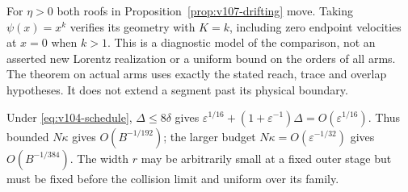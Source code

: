 \begin{remark}\label{rem:v107-scope}
For $\eta>0$ both roofs in Proposition~\ref{prop:v107-drifting}
move. Taking $\psi(x)=x^k$ verifies its geometry with $K=k$,
including zero endpoint velocities at $x=0$ when $k>1$.
This is a diagnostic model of the comparison, not an asserted new
Lorentz realization or a uniform bound on the orders of all arms.
The theorem on actual arms uses exactly the stated reach, trace and
overlap hypotheses. It does not extend a segment past its physical
boundary.

Under \eqref{eq:v104-schedule}, $\Delta\le8\delta$ gives
$\varepsilon^{1/16}+(1+\varepsilon^{-1})\Delta=O(\varepsilon^{1/16})$.
Thus bounded $N\kappa$ gives $O(B^{-1/192})$; the larger budget
$N\kappa=O(\varepsilon^{-1/32})$ gives $O(B^{-1/384})$.
The width $r$ may be arbitrarily small at a fixed outer stage but
must be fixed before the collision limit and uniform over its family.
\end{remark}
